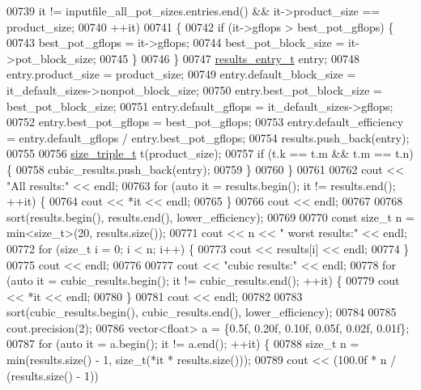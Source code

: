 \begin{DoxyCode}
{{{{{{00739            it != inputfile\_all\_pot\_sizes.entries.end() && it->product\_size == product\_size;
00740            ++it)
00741       \{
00742         \textcolor{keywordflow}{if} (it->gflops > best\_pot\_gflops) \{
00743           best\_pot\_gflops = it->gflops;
00744           best\_pot\_block\_size = it->pot\_block\_size;
00745         \}
00746       \}
00747       \hyperlink{structevaluate__defaults__action__t_1_1results__entry__t}{results\_entry\_t} entry;
00748       entry.product\_size = product\_size;
00749       entry.default\_block\_size = it\_default\_sizes->nonpot\_block\_size;
00750       entry.best\_pot\_block\_size = best\_pot\_block\_size;
00751       entry.default\_gflops = it\_default\_sizes->gflops;
00752       entry.best\_pot\_gflops = best\_pot\_gflops;
00753       entry.default\_efficiency = entry.default\_gflops / entry.best\_pot\_gflops;
00754       results.push\_back(entry);
00755 
00756       \hyperlink{structsize__triple__t}{size\_triple\_t} t(product\_size);
00757       \textcolor{keywordflow}{if} (t.k == t.m && t.m == t.n) \{
00758         cubic\_results.push\_back(entry);
00759       \}
00760     \}
00761 
00762     cout << \textcolor{stringliteral}{"All results:"} << endl;
00763     \textcolor{keywordflow}{for} (\textcolor{keyword}{auto} it = results.begin(); it != results.end(); ++it) \{
00764       cout << *it << endl;
00765     \}
00766     cout << endl;
00767 
00768     sort(results.begin(), results.end(), lower\_efficiency);
00769     
00770     \textcolor{keyword}{const} \textcolor{keywordtype}{size\_t} n = min<size\_t>(20, results.size());
00771     cout << n << \textcolor{stringliteral}{" worst results:"} << endl;
00772     \textcolor{keywordflow}{for} (\textcolor{keywordtype}{size\_t} i = 0; i < n; i++) \{
00773       cout << results[i] << endl;
00774     \}
00775     cout << endl;
00776 
00777     cout << \textcolor{stringliteral}{"cubic results:"} << endl;
00778     \textcolor{keywordflow}{for} (\textcolor{keyword}{auto} it = cubic\_results.begin(); it != cubic\_results.end(); ++it) \{
00779       cout << *it << endl;
00780     \}
00781     cout << endl;
00782 
00783     sort(cubic\_results.begin(), cubic\_results.end(), lower\_efficiency);
00784     
00785     cout.precision(2);
00786     vector<float> a = \{0.5f, 0.20f, 0.10f, 0.05f, 0.02f, 0.01f\};
00787     \textcolor{keywordflow}{for} (\textcolor{keyword}{auto} it = a.begin(); it != a.end(); ++it) \{
00788       \textcolor{keywordtype}{size\_t} n = min(results.size() - 1, size\_t(*it * results.size()));
00789       cout << (100.0f * n / (results.size() - 1))
}}}}}}
\end{DoxyCode}
